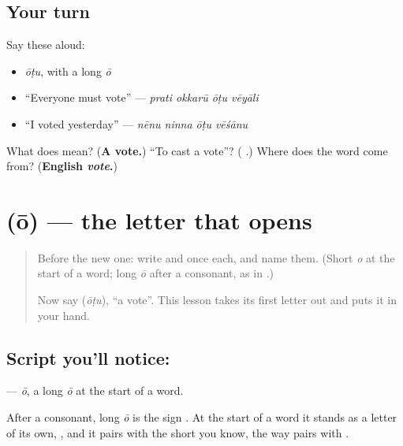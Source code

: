 \subsection*{Your turn}
Say these aloud:

\begin{itemize}
\raggedright
  \item \emph{ōṭu}, with a long \emph{ō}
  \item \textquotedblleft{}Everyone must vote\textquotedblright{} — \emph{prati okkarū ōṭu vēyāli}
  \item \textquotedblleft{}I voted yesterday\textquotedblright{} — \emph{nēnu ninna ōṭu vēśānu}
\end{itemize}

\begin{tcolorbox}[breakable,colback=teal!4,colframe=teal!35!black,title={Before you move on}]
What does \textbf{} mean? (\textbf{A vote.}) \textquotedblleft{}To cast a vote\textquotedblright{}? (\textbf{ }.) Where does the word come from? (\textbf{English \emph{vote}.})
\end{tcolorbox}
\section[\texorpdfstring{\te{ఓ} (ō)}{ఓ (ō)}]{ (ō) — the letter that opens }

\label{lesson:TE-S175-letter-oo}



\begin{quote}
Before the new one: write \textbf{} and \textbf{} once each, and name them. (Short \emph{o} at the start of a word; long \emph{ō} after a consonant, as in \textbf{}.)

Now say \textbf{} (\emph{ōṭu}), \textquotedblleft{}a vote\textquotedblright{}. This lesson takes its first letter out and puts it in your hand.
\end{quote}

\subsection*{Script you'll notice: }
\textbf{} — \emph{ō}, a long \emph{ō} at the start of a word.

After a consonant, long \emph{ō} is the sign \textbf{}. At the start of a word it stands as a letter of its own, \textbf{}, and it pairs with the short \textbf{} you know, the way \textbf{} pairs with \textbf{}.

